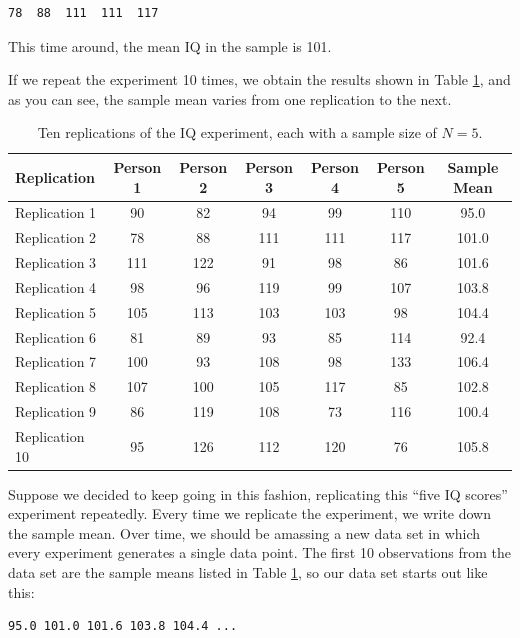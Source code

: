 \documentclass[
  11pt,
  a4paper,
  twoside,symmetric,openright]{book}
\theoremstyle{break}
\theoremstyle{break}
\begin{document}
\begin{verbatim}
78  88  111  111  117
\end{verbatim}

This time around, the mean IQ in the sample is 101.

If we repeat the experiment 10 times, we obtain the results shown in Table \ref{tab:replications}, and as you can see, the sample mean varies from one replication to the next.

\begin{table}

\caption{\label{tab:replications}Ten replications of the IQ experiment, each with a sample size of $N=5$.}
\centering
\begin{tabular}[t]{lcccccc}
\toprule
Replication & Person 1 & Person 2 & Person 3 & Person 4 & Person 5 & Sample Mean\\
\midrule
Replication 1 & 90 & 82 & 94 & 99 & 110 & 95.0\\
Replication 2 & 78 & 88 & 111 & 111 & 117 & 101.0\\
Replication 3 & 111 & 122 & 91 & 98 & 86 & 101.6\\
Replication 4 & 98 & 96 & 119 & 99 & 107 & 103.8\\
Replication 5 & 105 & 113 & 103 & 103 & 98 & 104.4\\
\addlinespace
Replication 6 & 81 & 89 & 93 & 85 & 114 & 92.4\\
Replication 7 & 100 & 93 & 108 & 98 & 133 & 106.4\\
Replication 8 & 107 & 100 & 105 & 117 & 85 & 102.8\\
Replication 9 & 86 & 119 & 108 & 73 & 116 & 100.4\\
Replication 10 & 95 & 126 & 112 & 120 & 76 & 105.8\\
\bottomrule
\end{tabular}
\end{table}

Suppose we decided to keep going in this fashion, replicating this ``five IQ scores'' experiment repeatedly. Every time we replicate the experiment, we write down the sample mean. Over time, we should be amassing a new data set in which every experiment generates a single data point. The first 10 observations from the data set are the sample means listed in Table \ref{tab:replications}, so our data set starts out like this:

\begin{verbatim}
95.0 101.0 101.6 103.8 104.4 ...
\end{verbatim}
\end{document}
